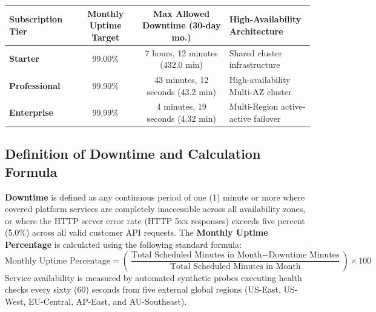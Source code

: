 \documentclass[10pt,letterpaper]{article}
\begin{document}
\vspace{1pt}
{\centering
\small
\renewcommand{\arraystretch}{1.08}
\begin{tabularx}{\linewidth}{@{}l c c X@{}}
\toprule
\rowcolor{tablehead}
\color{white}\textbf{Subscription Tier} & \color{white}\textbf{Monthly Uptime Target} & \color{white}\textbf{Max Allowed Downtime (30-day mo.)} & \color{white}\textbf{High-Availability Architecture} \\
\midrule
\rowcolor{rowalt}
\textbf{Starter} & 99.00\% & 7 hours, 12 minutes (432.0 min) & Shared cluster infrastructure \\
\textbf{Professional} & 99.90\% & 43 minutes, 12 seconds (43.2 min) & High-availability Multi-AZ cluster \\
\rowcolor{rowalt}
\textbf{Enterprise} & 99.99\% & 4 minutes, 19 seconds (4.32 min) & Multi-Region active-active failover \\
\bottomrule
\end{tabularx}
\label{tab:uptime-targets}
\par}

\subsection{Definition of Downtime and Calculation Formula}
\textbf{Downtime} is defined as any continuous period of one (1) minute or more where covered platform services are completely inaccessible across all availability zones, or where the HTTP server error rate (HTTP 5xx responses) exceeds five percent (5.0\%) across all valid customer API requests. The \textbf{Monthly Uptime Percentage} is calculated using the following standard formula:
\begin{equation*}
\text{Monthly Uptime Percentage} = \left( \frac{\text{Total Scheduled Minutes in Month} - \text{Downtime Minutes}}{\text{Total Scheduled Minutes in Month}} \right) \times 100
\end{equation*}
Service availability is measured by automated synthetic probes executing health checks every sixty (60) seconds from five external global regions (US-East, US-West, EU-Central, AP-East, and AU-Southeast).
\end{document}
